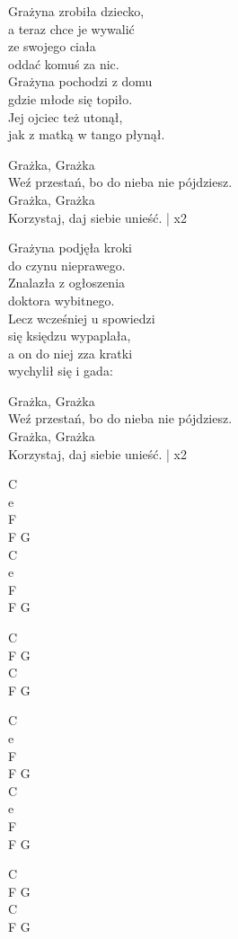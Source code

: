 \begin{text}
    Grażyna zrobiła dziecko,\\
    a teraz chce je wywalić\\
    ze swojego ciała\\
    oddać komuś za nic.\\
    Grażyna pochodzi z domu\\
    gdzie młode się topiło.\\
    Jej ojciec też utonął,\\
    jak z matką w tango płynął.

    Grażka, Grażka\\
    Weź przestań, bo do nieba nie pójdziesz.\\
    Grażka, Grażka\\
    Korzystaj, daj siebie unieść. | x2

    Grażyna podjęła kroki\\
    do czynu nieprawego.\\
    Znalazła z ogłoszenia\\
    doktora wybitnego.\\
    Lecz wcześniej u spowiedzi\\
    się księdzu wypaplała,\\
    a on do niej zza kratki\\
    wychylił się i gada:

    Grażka, Grażka\\
    Weź przestań, bo do nieba nie pójdziesz.\\
    Grażka, Grażka\\
    Korzystaj, daj siebie unieść. | x2
\end{text}
\begin{chord}
    C\\
    e\\
    F\\
    F G\\
    C\\
    e\\
    F\\
    F G

    C\\
    F G\\
    C\\
    F G

    C\\
    e\\
    F\\
    F G\\
    C\\
    e\\
    F\\
    F G

    C\\
    F G\\
    C\\
    F G
\end{chord}